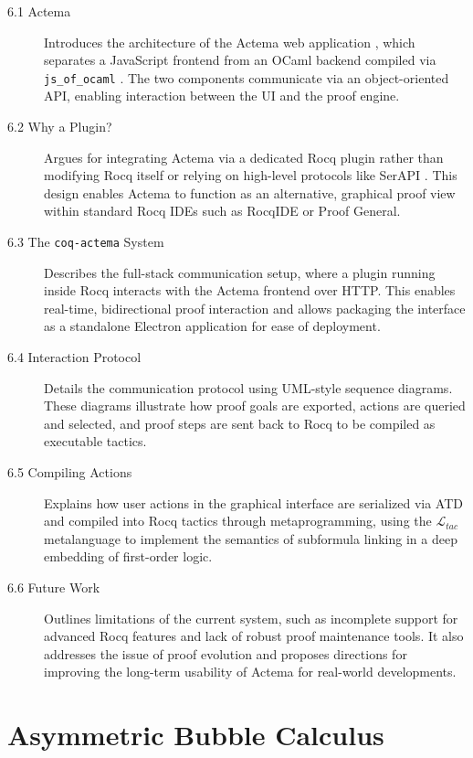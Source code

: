 \documentclass[11pt]{article}
\begin{document}
\begin{description}

  \item[6.1 Actema] 
  Introduces the architecture of the Actema web application \cite{Actema:link}, which separates a JavaScript frontend from an OCaml backend compiled via \texttt{js\_of\_ocaml} \cite{vouillon_bytecode_2014}. The two components communicate via an object-oriented API, enabling interaction between the UI and the proof engine.

  \item[6.2 Why a Plugin?]
  Argues for integrating Actema via a dedicated Rocq plugin rather than modifying Rocq itself or relying on high-level protocols like SerAPI \cite{gallegoarias:hal_01384408}. This design enables Actema to function as an alternative, graphical proof view within standard Rocq IDEs such as RocqIDE or Proof General.

  \item[6.3 The \texttt{coq-actema} System]
  Describes the full-stack communication setup, where a plugin running inside Rocq interacts with the Actema frontend over HTTP. This enables real-time, bidirectional proof interaction and allows packaging the interface as a standalone Electron application for ease of deployment.

  \item[6.4 Interaction Protocol]
  Details the communication protocol using UML-style sequence diagrams. These diagrams illustrate how proof goals are exported, actions are queried and selected, and proof steps are sent back to Rocq to be compiled as executable tactics.

  \item[6.5 Compiling Actions]
  Explains how user actions in the graphical interface are serialized via ATD \cite{atdgen} and compiled into Rocq tactics through metaprogramming, using the $\mathcal{L}_{tac}$ metalanguage to implement the semantics of subformula linking in a deep embedding of first-order logic.

  \item[6.6 Future Work]
  Outlines limitations of the current system, such as incomplete support for advanced Rocq features and lack of robust proof maintenance tools. It also addresses the issue of proof evolution and proposes directions for improving the long-term usability of Actema for real-world developments.

\end{description}

\section{Asymmetric Bubble Calculus}
\end{document}
